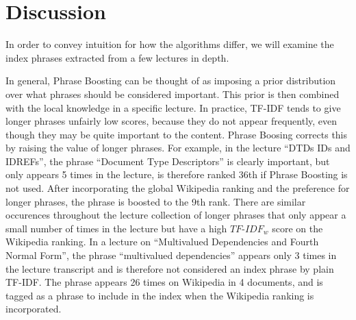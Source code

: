 \section{Discussion}
\label{sec:discussion}

In order to convey intuition for how the algorithms differ, we will
examine the index phrases extracted from a few lectures in depth.

In general, Phrase Boosting can be thought of as imposing a prior
distribution over what phrases should be considered important. This
prior is then combined with the local knowledge in a specific
lecture. In practice, TF-IDF tends to give longer phrases unfairly low
scores, because they do not appear frequently, even though they may be
quite important to the content. Phrase Boosing corrects this by
raising the value of longer phrases. For example, in the lecture
``DTDs IDs and IDREFs'', the phrase ``Document Type Descriptors'' is
clearly important, but only appears 5 times in the lecture, is
therefore ranked 36th if Phrase Boosting is not used. After
incorporating the global Wikipedia ranking and the preference for
longer phrases, the phrase is boosted to the 9th rank. There are
similar occurences throughout the lecture collection of longer phrases
that only appear a small number of times in the lecture but have a
high $TF\text{-}IDF_w$ score on the Wikipedia ranking. In a lecture on
``Multivalued Dependencies and Fourth Normal Form'', the phrase
``multivalued dependencies'' appears only 3 times in the lecture
transcript and is therefore not considered an index phrase by plain
TF-IDF. The phrase appears 26 times on Wikipedia in 4 documents, and
is tagged as a phrase to include in the index when the Wikipedia
ranking is incorporated.


